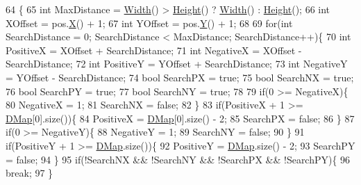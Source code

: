 \begin{DoxyCode}
64                                                                               \{
65     \textcolor{keywordtype}{int} MaxDistance = \hyperlink{classCTerrainMap_a34cb754aa9b26e85a73377159f2527d7}{Width}() > \hyperlink{classCTerrainMap_ae5e4bf6507e0e3e9ac0322b43eed8a7a}{Height}() ? \hyperlink{classCTerrainMap_a34cb754aa9b26e85a73377159f2527d7}{Width}() : \hyperlink{classCTerrainMap_ae5e4bf6507e0e3e9ac0322b43eed8a7a}{Height}();
66     \textcolor{keywordtype}{int} XOffset = pos.\hyperlink{classCPosition_a9a6b94d3b91df1492d166d9964c865fc}{X}() + 1;
67     \textcolor{keywordtype}{int} YOffset = pos.\hyperlink{classCPosition_a1aa8a30e2f08dda1f797736ba8c13a87}{Y}() + 1;
68     
69     \textcolor{keywordflow}{for}(\textcolor{keywordtype}{int} SearchDistance = 0; SearchDistance < MaxDistance; SearchDistance++)\{
70         \textcolor{keywordtype}{int} PositiveX = XOffset + SearchDistance;
71         \textcolor{keywordtype}{int} NegativeX = XOffset - SearchDistance;
72         \textcolor{keywordtype}{int} PositiveY = YOffset + SearchDistance;
73         \textcolor{keywordtype}{int} NegativeY = YOffset - SearchDistance;
74         \textcolor{keywordtype}{bool} SearchPX = \textcolor{keyword}{true};
75         \textcolor{keywordtype}{bool} SearchNX = \textcolor{keyword}{true};
76         \textcolor{keywordtype}{bool} SearchPY = \textcolor{keyword}{true};
77         \textcolor{keywordtype}{bool} SearchNY = \textcolor{keyword}{true};
78         
79         \textcolor{keywordflow}{if}(0 >= NegativeX)\{
80             NegativeX = 1;   
81             SearchNX = \textcolor{keyword}{false};
82         \}
83         \textcolor{keywordflow}{if}(PositiveX + 1 >= \hyperlink{classCTerrainMap_a80d154ce478948b10473534a7bca13f6}{DMap}[0].size())\{
84             PositiveX = \hyperlink{classCTerrainMap_a80d154ce478948b10473534a7bca13f6}{DMap}[0].size() - 2;
85             SearchPX = \textcolor{keyword}{false};
86         \}
87         \textcolor{keywordflow}{if}(0 >= NegativeY)\{
88             NegativeY = 1;
89             SearchNY = \textcolor{keyword}{false};
90         \}
91         \textcolor{keywordflow}{if}(PositiveY + 1 >= \hyperlink{classCTerrainMap_a80d154ce478948b10473534a7bca13f6}{DMap}.size())\{
92             PositiveY = \hyperlink{classCTerrainMap_a80d154ce478948b10473534a7bca13f6}{DMap}.size() - 2;
93             SearchPY = \textcolor{keyword}{false};
94         \}
95         \textcolor{keywordflow}{if}(!SearchNX && !SearchNY && !SearchPX && !SearchPY)\{
96             \textcolor{keywordflow}{break};
97         \}

\end{DoxyCode}
